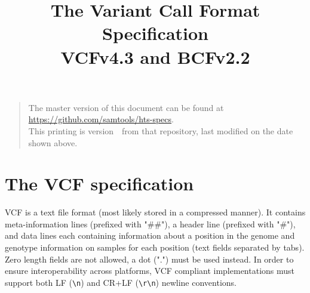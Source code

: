 \documentclass[8pt]{article}
\begin{document}

\title{The Variant Call Format Specification \\ \vspace{0.5em} \large VCFv4.3 and BCFv2.2}
\date{\headdate}
\maketitle
\begin{quote}\small
The master version of this document can be found at
\url{https://github.com/samtools/hts-specs}.\\
This printing is version~\commitdesc\ from that repository,
last modified on the date shown above.
\end{quote}
\vspace*{1em}

\newpage
\tableofcontents
\newpage

\section{The VCF specification}
VCF is a text file format (most likely stored in a compressed manner). 
It contains meta-information lines (prefixed with "\#\#"), a header
line (prefixed with "\#"), and data lines
each containing information about a position in the genome and genotype
information on samples for each position
(text fields separated by tabs). Zero length fields are not allowed, a dot (".") must
be used instead.
In order to ensure interoperability across platforms, VCF compliant implementations must support
both LF (\texttt{\textbackslash n}) and CR+LF (\texttt{\textbackslash r\textbackslash n}) newline conventions.  
\end{document}
